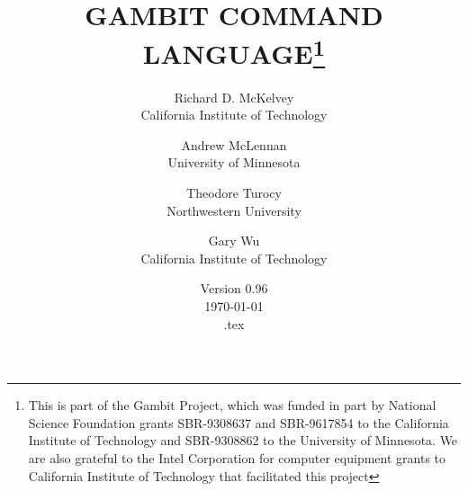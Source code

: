 %
%
%


\renewcommand{\baselinestretch}{.9}
\newcommand{\bd}{\begin{description}}
\newcommand{\ed}{\end{description}}

\newcommand{\tindex}[1]{{\tt #1}\index{{\tt #1}}}
\newcommand{\bindex}[1]{{\bf #1}\index{#1}}
\newcommand{\rindex}[1]{{#1}\index{#1}}
\makeindex


\newcommand{\lex}[1]{\mark{#1}\index{{\tt #1}}}

\makeatletter
\def\ps@lexicon{\def\@oddhead{\slshape\mysectionname\hfil 
{\Large\verb+\botmark+}\quad\thepage}
\def\@evenhead{\thepage\quad{\Large\verb+\firstmark+}\hfil \slshape\mysectionname}}
\makeatother

\newcommand{\mysectionname}{\thesection\,\, BUILT-IN FUNCTIONS}






\title{GAMBIT COMMAND LANGUAGE\thanks{This is part of the Gambit
Project, which was funded in part by National Science Foundation
grants SBR-9308637 and SBR-9617854 to the California Institute of
Technology and SBR-9308862 to the University of Minnesota.  We are
also grateful to the Intel Corporation for computer equipment grants
to California Institute of Technology that facilitated this project}}

\author{Richard D. McKelvey\\California Institute of
Technology
\and
Andrew McLennan\\University of
Minnesota
\and 
Theodore Turocy\\Northwestern University
\and
Gary Wu\\California Institute of Technology
}

\date{Version 0.96\\ \today\\ \jobname.tex}

\maketitle

